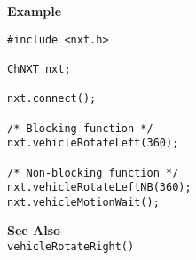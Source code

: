 \noindent
{\bf Example}
\begin{verbatim}
#include <nxt.h>

ChNXT nxt;

nxt.connect();

/* Blocking function */
nxt.vehicleRotateLeft(360);

/* Non-blocking function */
nxt.vehicleRotateLeftNB(360);
nxt.vehicleMotionWait();
\end{verbatim}

\noindent
{\bf See Also}\\
\texttt{vehicleRotateRight()}

